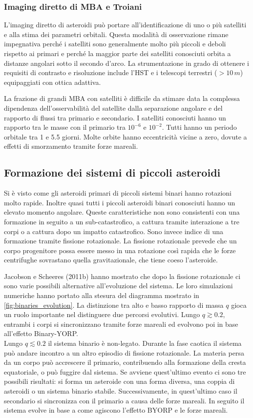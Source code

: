 \documentclass[a4paper,11pt,openright]{book}
\begin{document}
\subsubsection{Imaging diretto di MBA e Troiani}
L'imaging diretto di asteroidi può portare all'identificazione di uno o più satelliti e alla stima dei parametri orbitali. Questa modalità di osservazione rimane impegnativa perché i satelliti sono generalmente molto più piccoli e deboli rispetto ai primari e perché la maggior parte dei satelliti conosciuti orbita a distanze angolari sotto il secondo d'arco. La strumentazione in grado di ottenere i requisiti di contrasto e risoluzione include l'HST e i telescopi terrestri ($>10\,m$) equipaggiati con ottica adattiva.

La frazione di grandi MBA con satelliti è difficile da stimare data la complessa dipendenza dell'osservabilità del satellite dalla separazione angolare e del rapporto di flussi tra primario e secondario. I satelliti conosciuti hanno un rapporto tra le masse con il primario tra $10^{-6}$ e $10^{-2}$. Tutti hanno un periodo orbitale tra 1 e 5.5 giorni. Molte orbite hanno eccentricità vicine a zero, dovute a effetti di smorzamento tramite forze mareali.

\subsection{Formazione dei sistemi di piccoli asteroidi}
Si è visto come gli asteroidi primari di piccoli sistemi binari hanno rotazioni molto rapide. Inoltre quasi tutti i piccoli asteroidi binari conosciuti hanno un elevato momento angolare. Queste caratteristiche non sono consistenti con una formazione in seguito a un sub-catastrofico, a cattura tramite interazione a tre corpi o a cattura dopo un impatto catastrofico. Sono invece indice di una formazione tramite fissione rotazionale. La fissione rotazionale prevede che un corpo progenitore possa essere messo in una rotazione così rapida che le forze centrifughe sovrastano quella gravitazionale, che tiene coeso l'asteroide.

Jacobson e Scheeres (2011b) hanno mostrato che dopo la fissione rotazionale ci sono varie possibili alternative all'evoluzione del sistema. Le loro simulazioni numeriche hanno portato alla stesura del diagramma mostrato in \cref{fig:binaries_evolution}. La distinzione tra alto e basso rapporto di massa $q$ gioca un ruolo importante nel distinguere due percorsi evolutivi. Lungo $q\gtrsim0.2$, entrambi i corpi si sincronizzano tramite forze mareali ed evolvono poi in base all'effetto Binary-YORP.\\
Lungo $q\lesssim0.2$ il sistema binario è non-legato. Durante la fase caotica il sistema può andare incontro a un altro episodio di fissione rotazionale. La materia persa da un corpo può accrescere il primario, contribuendo alla formazione della cresta equatoriale, o può fuggire dal sistema. Se avviene quest'ultimo evento ci sono tre possibili risultati: si forma un asteroide con una forma diversa, una coppia di asteroidi o un sistema binario stabile. Successivamente, in quest'ultimo caso il secondario si sincronizza con il primario a causa delle forze mareali. In seguito il sistema evolve in base a come agiscono l'effetto BYORP e le forze mareali.
\end{document}
